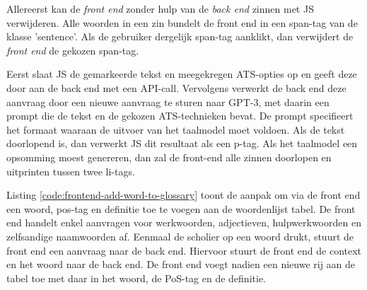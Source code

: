 Allereerst kan de \textit{front end} zonder hulp van de \textit{back end} zinnen met JS verwijderen. Alle woorden in een zin bundelt de front end in een span-tag van de klasse 'sentence'. Als de gebruiker dergelijk span-tag aanklikt, dan verwijdert de \textit{front end} de gekozen span-tag.


Eerst slaat JS de gemarkeerde tekst en meegekregen ATS-opties op en geeft deze door aan de back end met een API-call. Vervolgens verwerkt de back end deze aanvraag door een nieuwe aanvraag te sturen naar GPT-3, met daarin een prompt die de tekst en de gekozen ATS-technieken bevat. De prompt specifieert het formaat waaraan de uitvoer van het taalmodel moet voldoen.  Als de tekst doorlopend is, dan verwerkt JS dit resultaat als een p-tag.  Als het taalmodel een opsomming moest genereren, dan zal de front-end alle zinnen doorlopen en uitprinten tussen twee li-tags.


Listing \ref{code:frontend-add-word-to-glossary} toont de aanpak om via de front end een woord, pos-tag en definitie toe te voegen aan de woordenlijst tabel. De front end handelt enkel aanvragen voor werkwoorden, adjectieven, hulpwerkwoorden en zelfsandige naamwoorden af. Eenmaal de scholier op een woord drukt, stuurt de front end een aanvraag naar de back end. Hiervoor stuurt de front end de context en het woord naar de back end. De front end voegt nadien een nieuwe rij aan de tabel toe met daar in het woord, de PoS-tag en de definitie.

